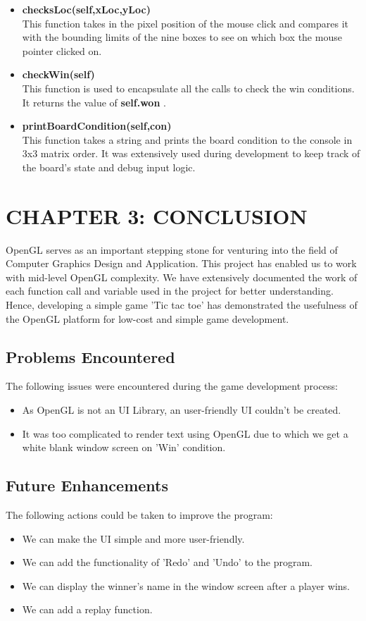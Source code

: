 \documentclass[12pt]{article}
\begin{document}
\begin{itemize}
    \item \textbf{checksLoc(self,xLoc,yLoc)}\\ This function takes in the pixel position of the mouse click and compares it with the bounding limits of the nine boxes to see on which box the mouse pointer clicked on.
    \item \textbf{checkWin(self)}\\ This function is used to encapsulate all the calls to check the win conditions. It returns the value of \textbf{self.won} .
    \item \textbf{printBoardCondition(self,con)}\\ This function takes a string and prints the board condition to the console in 3x3 matrix order. It was extensively used during development to keep track of the board's state and debug input logic.
\end{itemize}


\section{CHAPTER 3: CONCLUSION}
OpenGL serves as an important stepping stone for venturing into the field of Computer Graphics Design and Application. This project has enabled us to work with mid-level OpenGL complexity. We have extensively documented the work of each function call and variable used in the project for better understanding. Hence, developing a simple game 'Tic tac toe' has demonstrated the usefulness of the OpenGL platform for low-cost and simple game development.
\subsection{Problems Encountered}
The following issues were encountered during the game development process:
\begin{itemize}
    \item As OpenGL is not an UI Library, an user-friendly UI couldn't be created.
    \item It was too complicated to render text using OpenGL due to which we get a white blank window screen on 'Win' condition.
\end{itemize}
\subsection{Future Enhancements}
The following actions could be taken to improve the program:
\begin{itemize}
    \item We can make the UI simple and more user-friendly.
    \item We can add the functionality of 'Redo' and 'Undo' to the program.
    \item We can display the winner's name in the window screen after a player wins.
    \item We can add a replay function.
\end{itemize}
\end{document}
